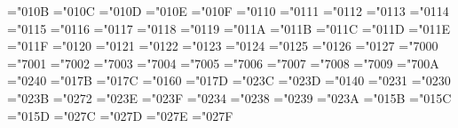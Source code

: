 \def\Pr{\mathop{\fam0\tenrm@ Pr}}
\def\gcd{\mathop{\fam0\tenrm@ gcd}}
\def\deg{\mathop{\fam0\tenrm@ deg}\nolimits}
\def\bigl{\mathopen\big}
\def\bigm{\mathrel\big}
\def\bigr{\mathclose\big}
\def\Bigl{\mathopen\Big}
\def\Bigm{\mathrel\Big}
\def\Bigr{\mathclose\Big}
\def\biggl{\mathopen\bigg}
\def\biggm{\mathrel\bigg}
\def\biggr{\mathclose\bigg}
\def\Biggl{\mathopen\Bigg}
\def\Biggm{\mathrel\Bigg}
\def\Biggr{\mathclose\Bigg}
\def\big#1{{\hbox{$\left#1\vbox to8.5pt{}\right.\n@space$}}}
\def\Big#1{{\hbox{$\left#1\vbox to11.5pt{}\right.\n@space$}}}
\def\bigg#1{{\hbox{$\left#1\vbox to14.5pt{}\right.\n@space$}}}
\def\Bigg#1{{\hbox{$\left#1\vbox to17.5pt{}\right.\n@space$}}}
\def\n@space{\nulldelimiterspace0pt \m@th}
\mathchardef\alpha="010B
\mathchardef\beta="010C
\mathchardef\gamma="010D
\mathchardef\delta="010E
\mathchardef\epsilon="010F
\mathchardef\zeta="0110
\mathchardef\eta="0111
\mathchardef\theta="0112
\mathchardef\iota="0113
\mathchardef\kappa="0114
\mathchardef\lambda="0115
\mathchardef\mu="0116
\mathchardef\nu="0117
\mathchardef\xi="0118
\mathchardef\pi="0119
\mathchardef\rho="011A
\mathchardef\sigma="011B
\mathchardef\tau="011C
\mathchardef\upsilon="011D
\mathchardef\phi="011E
\mathchardef\chi="011F
\mathchardef\psi="0120
\mathchardef\omega="0121
\mathchardef\varepsilon="0122
\mathchardef\vartheta="0123
\mathchardef\varpi="0124
\mathchardef\varrho="0125
\mathchardef\varsigma="0126
\mathchardef\varphi="0127
\mathchardef\Gamma="7000
\mathchardef\Delta="7001
\mathchardef\Theta="7002
\mathchardef\Lambda="7003
\mathchardef\Xi="7004
\mathchardef\Pi="7005
\mathchardef\Sigma="7006
\mathchardef\Upsilon="7007
\mathchardef\Phi="7008
\mathchardef\Psi="7009
\mathchardef\Omega="700A
\mathchardef\aleph="0240
\def\hbar{{\mathchar'26\mkern-9muh}}
\mathchardef\imath="017B
\mathchardef\jmath="017C
\mathchardef\ell="0160
\mathchardef\wp="017D
\mathchardef\Re="023C
\mathchardef\Im="023D
\mathchardef\partial="0140
\mathchardef\infty="0231
\mathchardef\prime="0230
\mathchardef\emptyset="023B
\mathchardef\nabla="0272
\def\surd{{\mathchar"1270}}
\mathchardef\top="023E
\mathchardef\bot="023F
\def\angle{{\vbox{\ialign{$\m@th\scriptstyle##$\crcr
      \not\mathrel{\mkern14mu}\crcr
      \noalign{\prevdepth-1000pt}
      \mkern2.5mu\leaders\hrule height.34pt\hfill\mkern2.5mu\crcr}}}}
\mathchardef\triangle="0234
\mathchardef\forall="0238
\mathchardef\exists="0239
\mathchardef\neg="023A \let\lnot=\neg
\mathchardef\flat="015B
\mathchardef\natural="015C
\mathchardef\sharp="015D
\mathchardef\clubsuit="027C
\mathchardef\diamondsuit="027D
\mathchardef\heartsuit="027E
\mathchardef\spadesuit="027F
